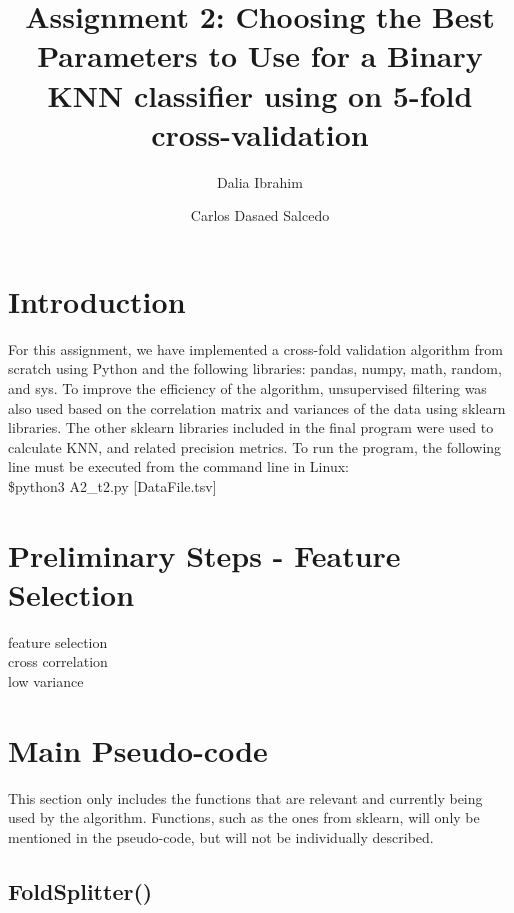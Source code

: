 \documentclass{article}
\author[1]{Dalia Ibrahim}
\author[2]{Carlos Dasaed Salcedo}
\affil[ ]{Studnet ID}
\affil[1]{201893217}
\affil[2]{201892008}
\begin{document}
  

\title{ Assignment 2: Choosing the Best Parameters to Use for a Binary KNN classifier using on 5-fold cross-validation}


\maketitle
 \section{Introduction}
For this assignment, we have implemented a cross-fold validation algorithm from scratch using Python and the following libraries: pandas, numpy, math, random, and sys. To improve the efficiency of the algorithm, unsupervised filtering was also used based on the correlation matrix and variances of the data using sklearn libraries. The other sklearn libraries included in the final program were used to calculate KNN, and related precision metrics. To run the program, the following line must be executed from the command line in Linux: \\
\$python3 A2\_t2.py [DataFile.tsv]\\

 \section{ Preliminary Steps - Feature Selection }
feature selection\\
cross correlation\\
low variance \\

 \section{Main Pseudo-code}
This section only includes the functions that are relevant and currently being used by the algorithm. Functions, such as the ones from sklearn, will only be mentioned in the pseudo-code, but will not be individually described.
 \subsection{FoldSplitter()}
\end{document}
